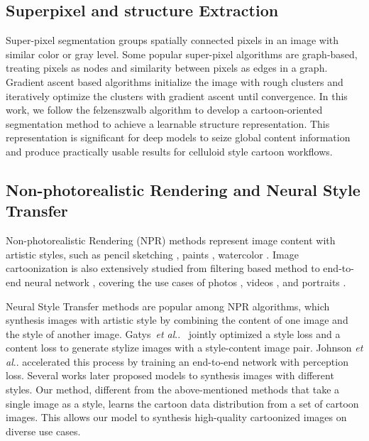 \documentclass[10pt,twocolumn,letterpaper]{article}
\makeatletter
\DeclareRobustCommand\onedot{\futurelet\@let@token\@onedot}
\def\@onedot{\ifx\@let@token.\else.\null\fi\xspace}
\def\etal{\emph{et al}\onedot}
\makeatother
\begin{document}
\vspace{-0.3em}
\subsection{Superpixel and structure Extraction}
\vspace{-0.3em}
Super-pixel segmentation \cite{felzenszwalb2004efficient, mori2005guiding, moore2008superpixel, achanta2012slic, levinshtein2009turbopixels} groups spatially connected pixels in an image with similar color or gray level. Some popular super-pixel algorithms \cite{felzenszwalb2004efficient, mori2005guiding, moore2008superpixel} are graph-based, treating pixels as nodes and similarity between pixels as edges in a graph. Gradient ascent based algorithms \cite{comaniciu2002mean, vedaldi2008quick, achanta2012slic,  levinshtein2009turbopixels} initialize the image with rough clusters and iteratively optimize the clusters with gradient ascent until convergence. In this work, we follow the felzenszwalb algorithm \cite{felzenszwalb2004efficient} to develop a cartoon-oriented segmentation method to achieve a learnable structure representation. This representation is significant for deep models to seize global content information and produce practically usable results for celluloid style cartoon workflows.

\vspace{-0.3em}
\subsection{Non-photorealistic Rendering and Neural Style Transfer}
\vspace{-0.3em}
Non-photorealistic Rendering (NPR) methods represent image content with artistic styles, such as pencil sketching \cite{xu2011image, lu2012combining}, paints \cite{gatys2015neural, johnson2016perceptual}, watercolor \cite{van2004real, curtis1997computer}. Image cartoonization is also extensively studied from filtering based method \cite{shahcheraghi2013effects} to end-to-end neural network \cite{chen2018cartoongan}, covering the use cases of photos \cite{chen2018cartoongan}, videos \cite{wang2004video}, and portraits \cite{rosin2015non, yang2010semantics}.

Neural Style Transfer methods \cite{gatys2015neural, johnson2016perceptual, dumoulin2016learned, huang2017arbitrary, li2017universal} are popular among NPR algorithms, which synthesis images with artistic style by combining the content of one image and the style of another image. Gatys~\etal~\cite{gatys2015neural} jointly optimized a style loss and a content loss to generate stylize images with a style-content image pair. Johnson \etal \cite{johnson2016perceptual} accelerated this process by training an end-to-end network with perception loss. Several works \cite{dumoulin2016learned, huang2017arbitrary, li2017universal} later proposed models to synthesis images with different styles. Our method, different from the above-mentioned methods that take a single image as a style, learns the cartoon data distribution from a set of cartoon images. This allows our model to synthesis high-quality cartoonized images on diverse use cases.
\vspace{-0.3em}
\end{document}
